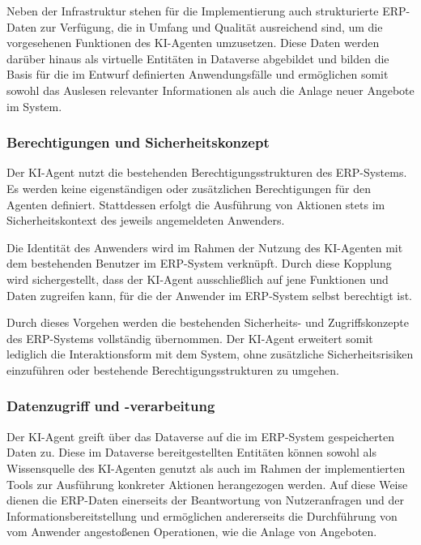 Neben der Infrastruktur stehen für die Implementierung auch strukturierte \ac{ERP}-Daten zur Verfügung, die in Umfang und Qualität ausreichend sind, um die vorgesehenen Funktionen des \ac{KI}-Agenten umzusetzen.
Diese Daten werden darüber hinaus als virtuelle Entitäten in Dataverse abgebildet und bilden die Basis für die im Entwurf definierten Anwendungsfälle und ermöglichen somit sowohl das Auslesen relevanter Informationen als auch die Anlage neuer Angebote im System.

\subsubsection{Berechtigungen und Sicherheitskonzept}

Der \ac{KI}-Agent nutzt die bestehenden Berechtigungsstrukturen des \ac{ERP}-Systems. Es werden keine eigenständigen oder zusätzlichen Berechtigungen für den Agenten definiert. Stattdessen erfolgt die Ausführung von Aktionen stets im Sicherheitskontext des jeweils angemeldeten Anwenders.

Die Identität des Anwenders wird im Rahmen der Nutzung des \ac{KI}-Agenten mit dem bestehenden Benutzer im \ac{ERP}-System verknüpft. Durch diese Kopplung wird sichergestellt, dass der \ac{KI}-Agent ausschließlich auf jene Funktionen und Daten zugreifen kann, für die der Anwender im \ac{ERP}-System selbst berechtigt ist.

Durch dieses Vorgehen werden die bestehenden Sicherheits- und Zugriffskonzepte des \ac{ERP}-Systems vollständig übernommen. Der \ac{KI}-Agent erweitert somit lediglich die Interaktionsform mit dem System, ohne zusätzliche Sicherheitsrisiken einzuführen oder bestehende Berechtigungsstrukturen zu umgehen.

\subsubsection{Datenzugriff und -verarbeitung}
Der \ac{KI}-Agent greift über das Dataverse auf die im \ac{ERP}-System gespeicherten Daten zu. Diese im Dataverse bereitgestellten Entitäten können sowohl als Wissensquelle des \ac{KI}-Agenten genutzt als auch im Rahmen der implementierten Tools zur Ausführung konkreter Aktionen herangezogen werden. Auf diese Weise dienen die \ac{ERP}-Daten einerseits der Beantwortung von Nutzeranfragen und der Informationsbereitstellung und ermöglichen andererseits die Durchführung von vom Anwender angestoßenen Operationen, wie die Anlage von Angeboten.


